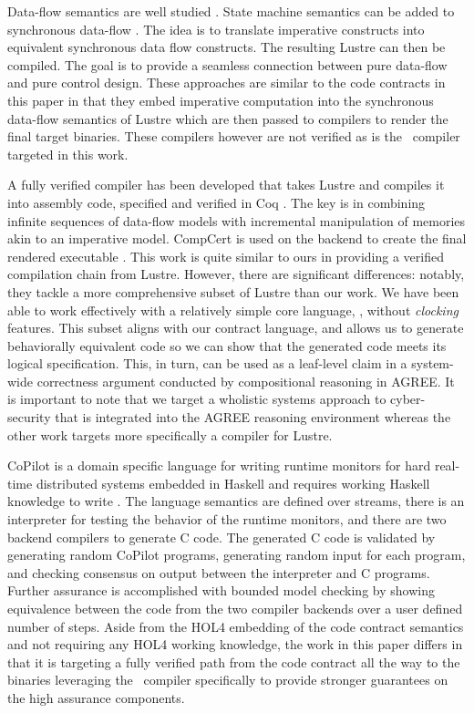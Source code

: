 Data-flow semantics are well studied \cite{10.1145/41625.41641,97300,
10.1145/1379023.1375674,10.1145/2345141.2248426,10.1007/978-3-540-45212-6_10}.
State machine semantics can be added to synchronous
data-flow \cite{10.1145/1086228.1086261}. The idea is to translate
imperative constructs into equivalent synchronous data flow
constructs. The resulting Lustre can then be compiled. The goal is to
provide a seamless connection between pure data-flow and pure control
design.
These approaches are similar to the code contracts in this paper in that they embed imperative computation into the synchronous data-flow semantics of Lustre which are then passed to compilers to render the final target binaries.
These compilers however are not verified as is the \ckml\ compiler targeted in this work.

A fully verified compiler has been developed that takes Lustre and compiles
it into assembly code, specified and verified in Coq \cite{10.1145/3140587.3062358}.
The key is in combining infinite sequences of data-flow models with incremental
manipulation of memories akin to an imperative model. CompCert is used on the
backend to create the final rendered executable \cite{compcert}.
This work is quite similar to
ours in providing a verified compilation chain from Lustre. However,
there are significant differences: notably, they tackle a more
comprehensive subset of Lustre than our work. We have been able to
work effectively with a relatively simple core language, \eg, without
\emph{clocking} features.  This subset aligns with our contract language, and
allows us to generate behaviorally equivalent code so we can show that the
generated code meets its logical specification.  This, in turn,
can be used as a leaf-level claim in a system-wide correctness argument
conducted by compositional reasoning in AGREE. It is important to note that we target a wholistic systems approach to cyber-security that is integrated into the AGREE reasoning environment whereas the other work targets more specifically a compiler for Lustre. 

CoPilot is a domain specific language for writing runtime monitors for
hard real-time distributed systems embedded in Haskell and requires
working Haskell knowledge to write \cite{10.1007/s11334-013-0223-x}.
The language semantics are defined over streams, there is an
interpreter for testing the behavior of the runtime monitors, and
there are two backend compilers to generate C code.  The generated C
code is validated by generating random CoPilot programs, generating
random input for each program, and checking consensus on output
between the interpreter and C programs.  Further assurance is
accomplished with bounded model checking by showing equivalence
between the code from the two compiler backends over a user defined
number of steps.  Aside from the HOL4 embedding of the code contract
semantics and not requiring any HOL4 working knowledge, the work in
this paper differs in that it is targeting a fully verified path from
the code contract all the way to the binaries leveraging the \ckml\
compiler specifically to provide stronger guarantees on the high
assurance components.

